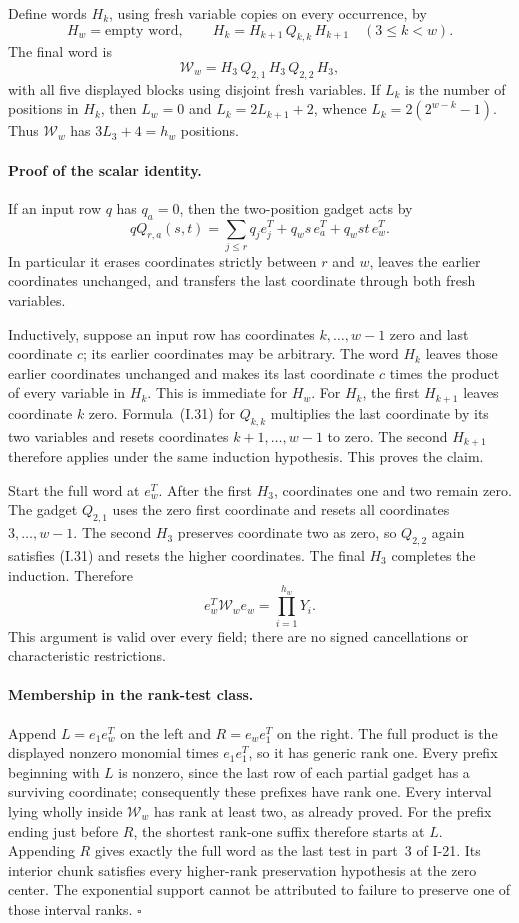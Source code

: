 \documentclass[11pt,a4paper]{article}
\theoremstyle{definition}\newtheorem{definition}{Definition}
\begin{document}
Define words $H_k$, using fresh variable copies on every
occurrence, by
\[
 H_w=\text{empty word},\qquad
 H_k=H_{k+1}\,Q_{k,k}\,H_{k+1}
       \quad(3\le k<w).
\]
The final word is
\[
 \mathcal W_w=H_3\,Q_{2,1}\,H_3\,Q_{2,2}\,H_3,
\]
with all five displayed blocks using disjoint fresh variables.
If $L_k$ is the number of positions in $H_k$, then
$L_w=0$ and $L_k=2L_{k+1}+2$, whence
$L_k=2(2^{w-k}-1)$.  Thus $\mathcal W_w$ has
$3L_3+4=h_w$ positions.

\paragraph{Proof of the scalar identity.}
If an input row $q$ has $q_a=0$, then the two-position gadget
acts by
\[
 qQ_{r,a}(s,t)
   =\sum_{j\le r}q_je_j^T+q_ws\,e_a^T+q_wst\,e_w^T.
 \tag{I.31}
\]
In particular it erases coordinates strictly between $r$ and
$w$, leaves the earlier coordinates unchanged, and transfers
the last coordinate through both fresh variables.

Inductively, suppose an input row has coordinates
$k,\ldots,w-1$ zero and last coordinate $c$; its earlier
coordinates may be arbitrary.  The word $H_k$ leaves those
earlier coordinates unchanged and makes its last coordinate
$c$ times the product of every variable in $H_k$.
This is immediate for $H_w$.  For $H_k$, the first
$H_{k+1}$ leaves coordinate $k$ zero.  Formula~(I.31) for
$Q_{k,k}$ multiplies the last coordinate by its two variables
and resets coordinates $k+1,\ldots,w-1$ to zero.  The second
$H_{k+1}$ therefore applies under the same induction
hypothesis.  This proves the claim.

Start the full word at $e_w^T$.  After the first $H_3$,
coordinates one and two remain zero.  The gadget $Q_{2,1}$
uses the zero first coordinate and resets all coordinates
$3,\ldots,w-1$.  The second $H_3$ preserves coordinate two
as zero, so $Q_{2,2}$ again satisfies (I.31) and resets the
higher coordinates.  The final $H_3$ completes the induction.
Therefore
\[
 e_w^T\mathcal W_we_w=\prod_{i=1}^{h_w}Y_i.
\]
This argument is valid over every field; there are no signed
cancellations or characteristic restrictions.

\paragraph{Membership in the rank-test class.}
Append $L=e_1e_w^T$ on the left and $R=e_we_1^T$ on the
right.  The full product is the displayed nonzero monomial
times $e_1e_1^T$, so it has generic rank one.  Every prefix
beginning with $L$ is nonzero, since the last row of each
partial gadget has a surviving coordinate; consequently these
prefixes have rank one.  Every interval lying wholly inside
$\mathcal W_w$ has rank at least two, as already proved.
For the prefix ending just before $R$, the shortest rank-one
suffix therefore starts at $L$.  Appending $R$ gives exactly
the full word as the last test in part~3 of I-21.
Its interior chunk satisfies every higher-rank preservation
hypothesis at the zero center.  The exponential support cannot
be attributed to failure to preserve one of those interval
ranks. \hfill$\square$
\end{document}
